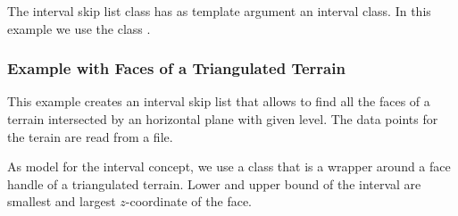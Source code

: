 The interval skip list class has as template argument an interval
class. In this example we use the class .

\newpage
{}

\subsubsection{Example with Faces of a Triangulated Terrain}



This example creates an interval skip list that allows to find all the faces
of a terrain intersected by an horizontal plane with given level.
The data points for the terain are  read from a file. 

As model for the interval concept, we use a class that is a wrapper
around a face handle of a triangulated terrain. Lower and upper bound
of the interval are smallest and largest $z$-coordinate of the face.




%



